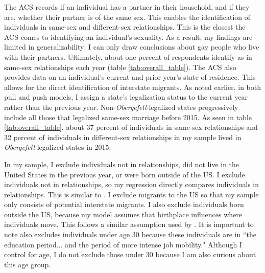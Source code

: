 \documentclass[12pt,letterpaper]{article}
\begin{document}
The ACS records if an individual has a partner in their household, and if they are, whether their partner is of the same sex. This enables the identification of individuals in same-sex and different-sex relationships. This is the closest the ACS comes to identifying an individual's sexuality. As a result, my findings are limited in generalizability: I can only draw conclusions about gay people who live with their partners. Ultimately, about one percent of respondents identify as in same-sex relationships each year (table \ref{tab:overall_table}). The ACS also provides data on an individual's current and prior year's state of residence. This allows for the direct identification of interstate migrants. As noted earlier, in both pull and push models, I assign a state's legalization status to the current year rather than the previous year. Non-\textit{Obergefell}-legalized states progressively include all those that legalized same-sex marriage before 2015. As seen in table \ref{tab:overall_table}, about 37 percent of individuals in same-sex relationships and 32 percent of individuals in different-sex relationships in my sample lived in \textit{Obergefell}-legalized states in 2015.
\FloatBarrier


In my sample, I exclude individuals not in relationships, did not live in the United States in the previous year, or were born outside of the US. I exclude individuals not in relationships, so my regression directly compares individuals in relationships. This is similar to \citet{1}. I exclude migrants to the US so that my sample only consists of potential interstate migrants. I also exclude individuals born outside the US, because my model assumes that birthplace influences where individuals move. This follows a similar assumption used by \citet{12}. It is important to note \citet[446]{1} also excludes individuals under age 30 because these individuals are in ``the education period... and the period of more intense job mobility." Although I control for age, I do not exclude those under 30 because I am also curious about this age group.
\end{document}
